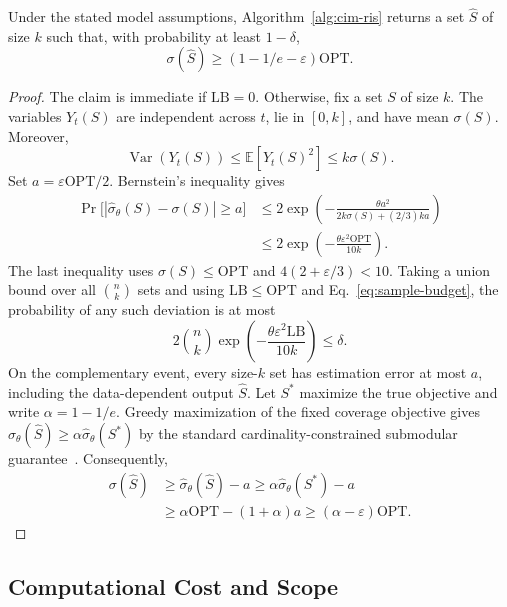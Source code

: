\documentclass[sigconf]{acmart}
\begin{document}
\begin{theorem}
\label{thm:approx}
Under the stated model assumptions, Algorithm~\ref{alg:cim-ris}
returns a set $\hat S$ of size $k$ such that, with probability
at least $1-\delta$,
\begin{equation}
\label{eq:approx-bound}
 \sigma(\hat S)\ge(1-1/e-\varepsilon)\mathrm{OPT}.
\end{equation}
\end{theorem}
\begin{proof}
The claim is immediate if $\mathrm{LB}=0$. Otherwise, fix a set
$S$ of size $k$. The variables $Y_t(S)$ are independent across
$t$, lie in $[0,k]$, and have mean $\sigma(S)$. Moreover,
\[
 \operatorname{Var}(Y_t(S))\le\mathbb E[Y_t(S)^2]
 \le k\sigma(S).
\]
Set $a=\varepsilon\mathrm{OPT}/2$. Bernstein's inequality gives
\begin{align}
\label{eq:bernstein}
 \Pr\bigl[|\hat\sigma_\theta(S)-\sigma(S)|\ge a\bigr]
 &\le 2\exp\left(-\frac{\theta a^2}
 {2k\sigma(S)+(2/3)ka}\right)\nonumber\\
 &\le 2\exp\left(-\frac{\theta\varepsilon^2\mathrm{OPT}}
 {10k}\right).
\end{align}
The last inequality uses $\sigma(S)\le\mathrm{OPT}$ and
$4(2+\varepsilon/3)<10$. Taking a union bound over all
$\binom nk$ sets and using $\mathrm{LB}\le\mathrm{OPT}$ and
Eq.~\eqref{eq:sample-budget}, the probability of any such
deviation is at most
\[
 2\binom nk\exp\left(-\frac{\theta\varepsilon^2\mathrm{LB}}
 {10k}\right)\le\delta.
\]
On the complementary event, every size-$k$ set has estimation
error at most $a$, including the data-dependent output $\hat S$.
Let $S^*$ maximize the true objective and write $\alpha=1-1/e$.
Greedy maximization of the fixed coverage objective gives
$\hat\sigma_\theta(\hat S)\ge\alpha\hat\sigma_\theta(S^*)$
by the standard cardinality-constrained submodular guarantee~\cite{nemhauser1978analysis}.
Consequently,
\begin{align*}
 \sigma(\hat S)
 &\ge\hat\sigma_\theta(\hat S)-a
 \ge\alpha\hat\sigma_\theta(S^*)-a\\
 &\ge\alpha\mathrm{OPT}-(1+\alpha)a
 \ge(\alpha-\varepsilon)\mathrm{OPT}.
\end{align*}
\end{proof}

\subsection{Computational Cost and Scope}
\label{sec:discussion-sampling}
\end{document}
